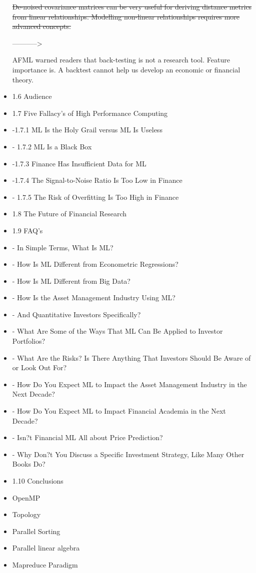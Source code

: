 \documentclass[10pt]{article}[draft]
\begin{document}
\begin{itemize}
		
		
		
		\st{De-noised covariance matrices can be very useful for deriving distance metrics from linear relationships. Modelling non-linear relationships requires more advanced concepts. }
		
		
		
		
		
		----------->
		
	
		
	
		AFML warned readers that back-testing is not a research tool. Feature importance is. A backtest cannot help us develop an economic or financial theory.
		
		
		\item 1.6 Audience
		\item 1.7 Five Fallacy's of High Performance Computing
		\item -1.7.1 ML Is the Holy Grail versus ML Is Useless
	\item 	- 1.7.2 ML Is a Black Box
		\item -1.7.3 Finance Has Insufficient Data for ML
		\item -1.7.4 The Signal-to-Noise Ratio Is Too Low in Finance
	\item 	- 1.7.5 The Risk of Overfitting Is Too High in Finance
		\item 1.8 The Future of Financial Research
	\item 	1.9 FAQ's
	\item 	- In Simple Terms, What Is ML?
	\item 	-  How Is ML Different from Econometric Regressions?
	\item 	- How Is ML Different from Big Data?
	\item 	- How Is the Asset Management Industry Using ML?
	\item 	- And Quantitative Investors Specifically?
	\item 	-  What Are Some of the Ways That ML Can Be Applied to Investor Portfolios?
	\item 	- What Are the Risks? Is There Anything That Investors Should Be Aware of or Look Out For?
	\item 	- How Do You Expect ML to Impact the Asset Management Industry in the Next Decade?
	\item 	- How Do You Expect ML to Impact Financial Academia in the Next Decade?
	\item 	- Isn?t Financial ML All about Price Prediction?
	\item 	- Why Don?t You Discuss a Specific Investment Strategy, Like Many Other Books Do?
	\item 	1.10 Conclusions \\
	\item OpenMP \\
	\item Topology 
	\item Parallel Sorting \\
	\item Parallel linear algebra \\
	\item Mapreduce Paradigm \\
	\end{itemize}


\end{document}
